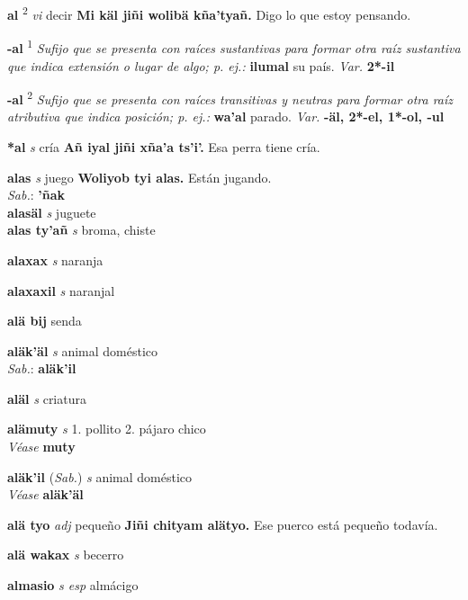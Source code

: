 \documentclass[10pt]{scrbook}
\newcommand{\entry}[1]{\textbf{#1}}
\newcommand{\onedefinition}[1]{#1.}
\newcommand{\defsuperscript}[1]{\textsuperscript{#1}}
\newcommand{\nontranslationdef}[1]{\textit{#1}}
\newcommand{\partofspeech}[1]{\textit{#1}}
\newcommand{\spanishtranslation}[1]{#1}
\newcommand{\cholexample}[1]{\textbf{#1}}
\newcommand{\exampletranslation}[1]{#1}
\newcommand{\dialectvariant}[1]{\\\textit{#1}:}
\newcommand{\dialectword}[1]{\textbf{#1}}
\newcommand{\alsosee}[1]{\\\textit{Véase} \textbf{#1}}
\newcommand{\relevantdialect}[1]{(\textit{#1})}
\newcommand{\secondaryentry}[1]{\\\textbf{#1}}
\newcommand{\secondpartofspeech}[1]{\textit{#1}}
\newcommand{\secondtranslation}[1]{#1}
\newcommand{\variation}[1]{\textit{Var.} \textbf{#1}}
\begin{document}
\begin{multicols}{2}
\entry{al}
\defsuperscript{2}
\partofspeech{vi}
\spanishtranslation{decir}
\cholexample{Mi käl jiñi wolibä kña'tyañ.}
\exampletranslation{Digo lo que estoy pensando.}

\entry{-al}
\defsuperscript{1}
\nontranslationdef{Sufijo que se presenta con raíces sustantivas para formar otra raíz sustantiva que indica extensión o lugar de algo; p. ej.:}
\cholexample{ilumal}
\exampletranslation{su país.}
\variation{2*-il}

\entry{-al}
\defsuperscript{2}
\nontranslationdef{Sufijo que se presenta con raíces transitivas y neutras para formar otra raíz atributiva que indica posición; p. ej.:}
\cholexample{wa'al}
\exampletranslation{parado.}
\variation{-äl, 2*-el, 1*-ol, -ul}

\entry{*al}
\partofspeech{s}
\spanishtranslation{cría}
\cholexample{Añ iyal jiñi xña'a ts'i'.}
\exampletranslation{Esa perra tiene cría.}

\entry{alas}
\partofspeech{s}
\spanishtranslation{juego}
\cholexample{Woliyob tyi alas.}
\exampletranslation{Están jugando.}
\dialectvariant{Sab.}
\dialectword{'ñak}
\secondaryentry{alasäl}
\secondpartofspeech{s}
\secondtranslation{juguete}
\secondaryentry{alas ty'añ}
\secondpartofspeech{s}
\secondtranslation{broma, chiste}

\entry{alaxax}
\partofspeech{s}
\spanishtranslation{naranja}

\entry{alaxaxil}
\partofspeech{s}
\spanishtranslation{naranjal}

\entry{alä bij}
\spanishtranslation{senda}

\entry{aläk'äl}
\partofspeech{s}
\spanishtranslation{animal doméstico}
\dialectvariant{Sab.}
\dialectword{aläk'il}

\entry{aläl}
\partofspeech{s}
\spanishtranslation{criatura}

\entry{alämuty}
\partofspeech{s}
\onedefinition{1}
\spanishtranslation{pollito}
\onedefinition{2}
\spanishtranslation{pájaro chico}
\alsosee{muty}

\entry{aläk'il}
\relevantdialect{Sab.}
\partofspeech{s}
\spanishtranslation{animal doméstico}
\alsosee{aläk'äl}

\entry{alä tyo}
\partofspeech{adj}
\spanishtranslation{pequeño}
\cholexample{Jiñi chityam alätyo.}
\exampletranslation{Ese puerco está pequeño todavía.}

\entry{alä wakax}
\partofspeech{s}
\spanishtranslation{becerro}

\entry{almasio}
\partofspeech{s esp}
\spanishtranslation{almácigo}


\end{multicols}
\end{document}
